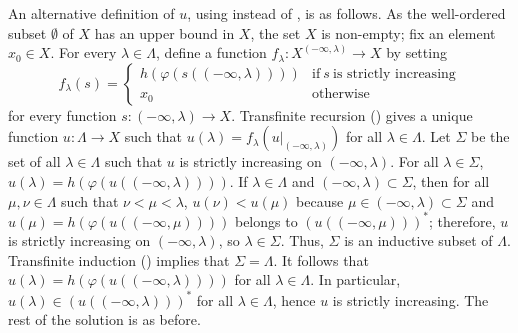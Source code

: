 \documentclass{article}
\begin{document}
\begin{solution}[\ref{exe:k8tmok20}]
  An alternative definition of \(u\), using 
  instead of , is as follows.  As the well-ordered
  subset \(\emptyset\) of \(X\) has an upper bound in \(X\), the set
  \(X\) is non-empty; fix an element \(x_0 \in X\).  For every
  \(\lambda \in \Lambda\), define a function
  \(f_\lambda : X^{(-\infty, \lambda)} \to X\) by setting
  \begin{displaymath}
    f_\lambda(s) =
    \begin{cases}
      h(\varphi(s((-\infty, \lambda))))
      & \text{if} ~ s ~ \text{is strictly increasing} \\
      x_0
      &
        \text{otherwise}
    \end{cases}
  \end{displaymath}
  for every function \(s : (-\infty, \lambda) \to X\).  Transfinite
  recursion () gives a unique function
  \(u : \Lambda \to X\) such that
  \(u(\lambda) = f_\lambda(u \vert_{(-\infty, \lambda)})\) for all
  \(\lambda \in \Lambda\).  Let \(\Sigma\) be the set of all
  \(\lambda \in \Lambda\) such that \(u\) is strictly increasing on
  \((-\infty, \lambda)\).  For all \(\lambda \in \Sigma\),
  \(u(\lambda) = h(\varphi(u((-\infty, \lambda))))\).  If
  \(\lambda \in \Lambda\) and \((-\infty, \lambda) \subset \Sigma\),
  then for all \(\mu, \nu \in \Lambda\) such that
  \(\nu < \mu < \lambda\), \(u(\nu) < u(\mu)\) because
  \(\mu \in (-\infty, \lambda) \subset \Sigma\) and
  \(u(\mu) = h(\varphi(u((-\infty, \mu))))\) belongs to
  \((u((-\infty, \mu)))^*\); therefore, \(u\) is strictly increasing
  on \((-\infty, \lambda)\), so \(\lambda \in \Sigma\).  Thus,
  \(\Sigma\) is an inductive subset of \(\Lambda\).  Transfinite
  induction () implies that \(\Sigma = \Lambda\).
  It follows that \(u(\lambda) = h(\varphi(u((-\infty, \lambda))))\)
  for all \(\lambda \in \Lambda\).  In particular,
  \(u(\lambda) \in (u((-\infty, \lambda)))^*\) for all
  \(\lambda \in \Lambda\), hence \(u\) is strictly increasing.  The
  rest of the solution is as before.
\end{solution}

\bibsection
\end{document}
